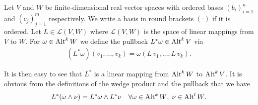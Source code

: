 \documentclass[../main.tex]{subfiles}
\begin{document}
\begin{definition}
    Let $V$ and $W$ be finite-dimensional real
    vector spaces with ordered bases $(b_i)_{i=1}^n$ and $(c_j)_{j=1}^m$ 
    respectively. We write a basis in round brackets $(\cdot)$ if it is 
    ordered. Let $L \in \mathcal{L}(V,W)$ where $\mathcal{L}(V,W)$ is the 
    space of linear mappings from $V$ to $W$. For $\omega \in {\text{Alt}^{k}\,W}$
    we define the pullback $L^* \omega \in {\text{Alt}^{k}\,V}$ via 
    \begin{align*}
        (L^* \omega)(v_1,...,v_k) = \omega(L\,v_1,...,L\,v_k).
    \end{align*} 
\end{definition}
It is then easy to see that 
$L^*$ is a linear mapping from ${\text{Alt}^{k}\,W}$ to 
${\text{Alt}^{k}\,V}$.
It is obvious from the definitions of the wedge product and 
the pullback that we have 
\begin{align*}
    L^*(\omega \wedge \nu) = L^*\omega \wedge L^* \nu \quad \forall 
        \omega \in {\text{Alt}^{k}\,W}, \; \nu \in {\text{Alt}^{l}\,W}.
\end{align*}
\end{document}

